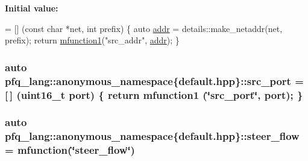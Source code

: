 {\bfseries Initial value\+:}
\begin{DoxyCode}
= [] (\textcolor{keyword}{const} \textcolor{keywordtype}{char} *net, \textcolor{keywordtype}{int} prefix)
        \{
            \textcolor{keyword}{auto} \hyperlink{namespacepfq__lang_1_1anonymous__namespace_02default_8hpp_03_aafce8334d1be83bff9a2115439c8c453}{addr} = details::make\_netaddr(net, prefix);
            \textcolor{keywordflow}{return} \hyperlink{namespacepfq__lang_a3cc9d61411c0398bb46aa2b33a21f7ed}{mfunction1}(\textcolor{stringliteral}{"src\_addr"}, \hyperlink{namespacepfq__lang_1_1anonymous__namespace_02default_8hpp_03_aafce8334d1be83bff9a2115439c8c453}{addr});
        \}
\end{DoxyCode}
\hypertarget{namespacepfq__lang_1_1anonymous__namespace_02default_8hpp_03_ad4d03d1e69ba9608a2d87ac91a2b521f}{
\subsubsection[{src\+\_\+port}]{\setlength{\rightskip}{0pt plus 5cm}auto pfq\+\_\+lang\+::anonymous\+\_\+namespace\{default.\+hpp\}\+::src\+\_\+port = \mbox{[}$\,$\mbox{]} (uint16\+\_\+t {\bf port}) \{ return {\bf mfunction1} (\char`\"{}src\+\_\+port\char`\"{}, port); \}}}\label{namespacepfq__lang_1_1anonymous__namespace_02default_8hpp_03_ad4d03d1e69ba9608a2d87ac91a2b521f}
\hypertarget{namespacepfq__lang_1_1anonymous__namespace_02default_8hpp_03_aee7b4eb8c316f9c0cd6ee7bc22b517ef}{
\subsubsection[{steer\+\_\+flow}]{\setlength{\rightskip}{0pt plus 5cm}auto pfq\+\_\+lang\+::anonymous\+\_\+namespace\{default.\+hpp\}\+::steer\+\_\+flow = {\bf mfunction}(\char`\"{}steer\+\_\+flow\char`\"{})}}\label{namespacepfq__lang_1_1anonymous__namespace_02default_8hpp_03_aee7b4eb8c316f9c0cd6ee7bc22b517ef}
